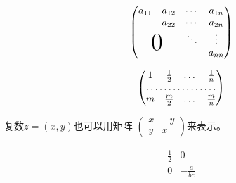 \documentclass{ctexart}
\begin{document}
    \[
        \begin{pmatrix}
            a_{11}                                              & a_{12} & \cdots & a_{1n}  \\
                                                                & a_{22} & \cdots & a_{2n}  \\
                                                                &        & \ddots & \vdots  \\
            \multicolumn{2}{c}{\raisebox{1.3ex}[0pt]{\Huge 0}}  & & a_{nn}
        \end{pmatrix}
    \]

    \[
        \begin{pmatrix}
            1 & \frac 12 & \dots & \frac 1n \\
            \hdotsfor{4}    \\
            m & \frac m2 & \dots & \frac mn
        \end{pmatrix}
    \]

    复数$z = (x, y)$也可以用矩阵
    \begin{math}
        \left(  %
            \begin{smallmatrix}
                x & -y \\
                y & x
            \end{smallmatrix}
        \right)
    \end{math}来表示。

    \[
        \begin{array}{r|r}
            \frac 12    & 0 \\
            \hline
            0           & -\frac a{bc}
        \end{array}
    \]
\end{document}
